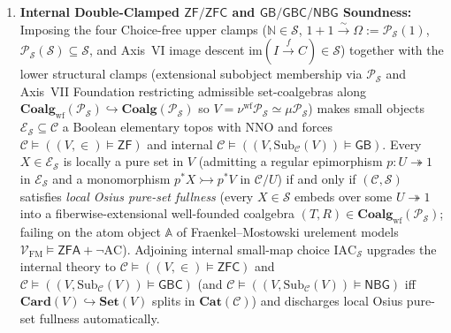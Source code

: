 \begin{theorem}
\begin{enumerate}
  \item \textbf{Internal Double-Clamped $\mathsf{ZF}/\mathsf{ZFC}$ and $\mathsf{GB}/\mathsf{GBC}/\mathsf{NBG}$ Soundness:} Imposing the four Choice-free upper clamps ($\mathbb{N} \in \mathcal{S}$, $1 + 1 \xrightarrow{\sim} \Omega := \mathcal{P}_{\mathcal{S}}(1)$, $\mathcal{P}_{\mathcal{S}}(\mathcal{S}) \subseteq \mathcal{S}$, and Axis~VI image descent $\mathrm{im}(I \xrightarrow{f} C) \in \mathcal{S}$) together with the lower structural clamps (extensional subobject membership via $\mathcal{P}_{\mathcal{S}}$ and Axis~VII Foundation restricting admissible set-coalgebras along $\mathbf{Coalg}_{\mathrm{wf}}(\mathcal{P}_{\mathcal{S}}) \hookrightarrow \mathbf{Coalg}(\mathcal{P}_{\mathcal{S}})$ so $V = \nu^{\mathrm{wf}} \mathcal{P}_{\mathcal{S}} \simeq \mu \mathcal{P}_{\mathcal{S}}$) makes small objects $\mathcal{E}_{\mathcal{S}} \subseteq \mathcal{C}$ a Boolean elementary topos with $\mathrm{NNO}$ and forces $\mathcal{C} \models ((V, \in) \models \mathsf{ZF})$ and internal $\mathcal{C} \models ((V, \mathrm{Sub}_{\mathcal{C}}(V)) \models \mathsf{GB})$. Every $X \in \mathcal{E}_{\mathcal{S}}$ is locally a pure set in $V$ (admitting a regular epimorphism $p : U \twoheadrightarrow 1$ in $\mathcal{E}_{\mathcal{S}}$ and a monomorphism $p^* X \rightarrowtail p^* V$ in $\mathcal{C}/U$) if and only if $(\mathcal{C}, \mathcal{S})$ satisfies \emph{local Osius pure-set fullness} (every $X \in \mathcal{S}$ embeds over some $U \twoheadrightarrow 1$ into a fiberwise-extensional well-founded coalgebra $(T, R) \in \mathbf{Coalg}_{\mathrm{wf}}(\mathcal{P}_{\mathcal{S}})$; failing on the atom object $\mathbb{A}$ of Fraenkel--Mostowski urelement models $\mathcal{V}_{\mathrm{FM}} \models \mathsf{ZFA} + \neg\mathrm{AC}$). Adjoining internal small-map choice $\mathrm{IAC}_{\mathcal{S}}$ upgrades the internal theory to $\mathcal{C} \models ((V, \in) \models \mathsf{ZFC})$ and $\mathcal{C} \models ((V, \mathrm{Sub}_{\mathcal{C}}(V)) \models \mathsf{GBC})$ (and $\mathcal{C} \models ((V, \mathrm{Sub}_{\mathcal{C}}(V)) \models \mathsf{NBG})$ iff $\mathbf{Card}(V) \hookrightarrow \mathbf{Set}(V)$ splits in $\mathbf{Cat}(\mathcal{C})$) and discharges local Osius pure-set fullness automatically.

\end{enumerate}
\end{theorem}
